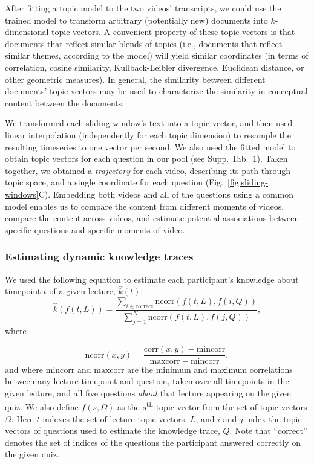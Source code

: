 \documentclass[10pt]{article}
\newcommand{\questions}{1}
\begin{document}
After fitting a topic model to the two videos' transcripts, we could use the
trained model to transform arbitrary (potentially new) documents into
$k$-dimensional topic vectors. A convenient property of these topic vectors is
that documents that reflect similar blends of topics (i.e., documents that
reflect similar themes, according to the model) will yield similar coordinates
(in terms of correlation, cosine similarity, Kullback-Leibler divergence,
Euclidean distance, or other geometric measures). In general, the similarity
between different documents' topic vectors may be used to characterize the
similarity in conceptual content between the documents.

We transformed each sliding window's text into a topic vector, and then used
linear interpolation (independently for each topic dimension) to resample the
resulting timeseries to one vector per second. We also used the fitted model to
obtain topic vectors for each question in our pool (see Supp. Tab.~\questions).
Taken together, we obtained a \textit{trajectory} for each video, describing
its path through topic space, and a single coordinate for each question
(Fig.~\ref{fig:sliding-windows}C). Embedding both videos and all of the
questions using a common model enables us to compare the content from different
moments of videos, compare the content across videos, and estimate potential
associations between specific questions and specific moments of video.


\subsubsection*{Estimating dynamic knowledge traces}\label{subsec:traces}

We used the following equation to estimate each participant's knowledge about
timepoint $t$ of a given lecture, $\hat{k}(t)$:
\begin{equation}
    \hat{k}\left(f(t, L)\right) = \frac{\sum_{i \in \mathrm{correct}}\mathrm{ncorr}\left(f(t, L), f(i, Q)\right)}{\sum_{j = 1}^N \mathrm{ncorr}\left(f(t, L), f(j, Q)\right)},
    \label{eqn:prop}
\end{equation}
where

\begin{equation}
    \mathrm{ncorr}(x, y) = \frac{\mathrm{corr}(x, y) - \mathrm{mincorr}}{\mathrm{maxcorr} - \mathrm{mincorr}},
\end{equation}
and where $\mathrm{mincorr}$ and $\mathrm{maxcorr}$ are the minimum and maximum
correlations between any lecture timepoint and question, taken over all
timepoints in the given lecture, and all five questions \textit{about} that lecture appearing on the given quiz.
We also define $f(s, \Omega)$ as the
$s$\textsuperscript{th} topic vector from the set of topic vectors $\Omega$.
Here $t$ indexes the set of lecture topic vectors, $L$, and $i$ and $j$ index
the topic vectors of questions used to estimate the knowledge trace, $Q$. Note
that ``correct'' denotes the set of indices of the questions the participant
answered correctly on the given quiz.
\end{document}
